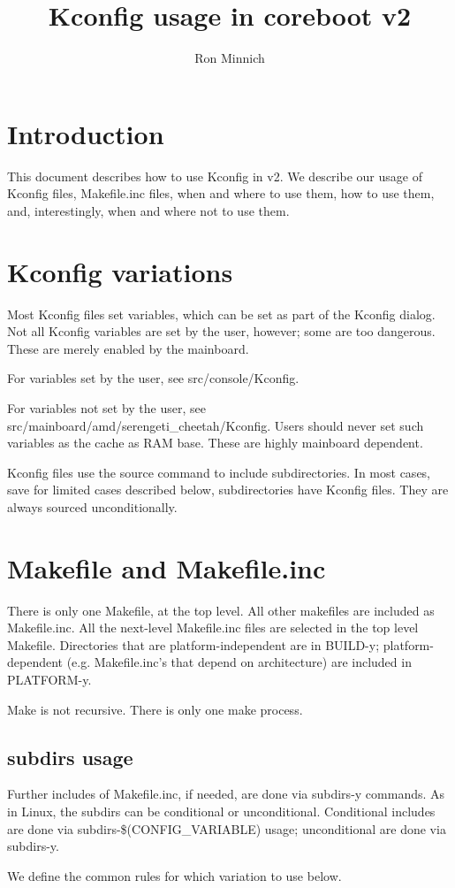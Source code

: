 \documentclass[10pt,letterpaper]{article}
\author{Ron Minnich}
\title{Kconfig usage in coreboot v2}
\begin{document}
\section{Introduction}
This document describes how to use Kconfig in v2. We describe our usage of Kconfig files, Makefile.inc files, when and where to use them, how to use them, and, interestingly, when and where not to use them.
\section{Kconfig variations}
Most Kconfig files set variables, which can be set as part of the Kconfig dialog. Not all Kconfig variables are set by the user, however; some are too dangerous. These are merely enabled by the mainboard.

For variables set by the user, see src/console/Kconfig.

For variables not set by the user, see src/mainboard/amd/serengeti\_cheetah/Kconfig. Users should never set such variables as the cache as RAM base. These are highly mainboard dependent.

Kconfig files use the source command to include subdirectories. In most cases, save for limited cases described below, subdirectories have Kconfig files. They are always sourced unconditionally.

\section{Makefile and Makefile.inc}
There is only one Makefile, at the top level. All other makefiles are included as Makefile.inc. All the next-level Makefile.inc files are selected in the top level Makefile. Directories that are platform-independent are in BUILD-y; platform-dependent (e.g. Makefile.inc's that depend on architecture) are included in PLATFORM-y.

Make is not recursive. There is only one make process.
\subsection{subdirs usage}
Further includes of Makefile.inc, if needed, are done via subdirs-y commands. As in Linux, the subdirs can be conditional or unconditional. Conditional includes are done via subdirs-\$(CONFIG\_VARIABLE) usage; unconditional are done via subdirs-y.

We define the common rules for which variation to use below.
\end{document}
